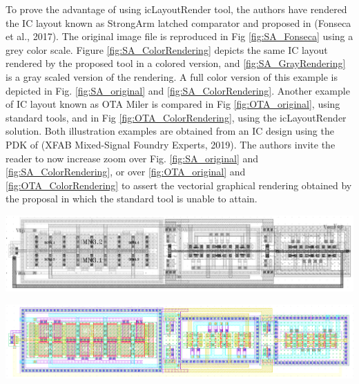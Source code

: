 \documentclass[10pt,a4paper,onecolumn]{article}
\let\textttOrig=\texttt
\def\texttt#1{\expandafter\textttOrig{\seqsplit{#1}}}
\begin{document}
To prove the advantage of using icLayoutRender tool, the authors have
rendered the IC layout known as StrongArm latched comparator and
proposed in (Fonseca et al., 2017). The original image file is
reproduced in Fig \autoref{fig:SA_Fonseca} using a grey color scale.
Figure \autoref{fig:SA_ColorRendering} depicts the same IC layout
rendered by the proposed tool in a colored version, and
\autoref{fig:SA_GrayRendering} is a gray scaled version of the
rendering. A full color version of this example is depicted in Fig.
\autoref{fig:SA_original} and \autoref{fig:SA_ColorRendering}. Another
example of IC layout known as OTA Miler is compared in Fig
\autoref{fig:OTA_original}, using standard tools, and in Fig
\autoref{fig:OTA_ColorRendering}, using the icLayoutRender solution.
Both illustration examples are obtained from an IC design using the PDK
of (XFAB Mixed-Signal Foundry Experts, 2019). The authors invite the
reader to now increase zoom over Fig. \autoref{fig:SA_original} and
\autoref{fig:SA_ColorRendering}, or over \autoref{fig:OTA_original} and
\autoref{fig:OTA_ColorRendering} to assert the vectorial graphical
rendering obtained by the proposal in which the standard tool is unable
to attain.

\includegraphics{img/SA_Fonseca.png}%

\includegraphics{img/SA_original.png}%
\end{document}
